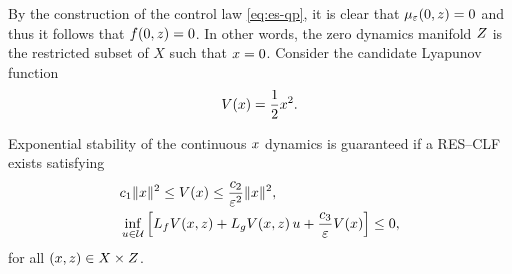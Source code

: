 \documentclass[twocolumn]{article}
\begin{document}
By the construction of the control law \eqref{eq:es-qp}, it is clear that $\mu_{\varepsilon}(0, z) = 0$ and thus it follows that $f(0, z) = 0$.
%
In other words, the zero dynamics manifold $Z$ is the restricted subset of $X$ such that $x = 0$.
%
Consider the candidate Lyapunov function
\begin{align}
  V(x) = \frac{1}{2} x^{2}.
\end{align}

\begin{proposition}  
  \label{prop:res-clf}
  Exponential stability of the continuous $x$ dynamics is guaranteed if a RES--CLF exists satisfying
  \begin{align}
    \label{eq:lyap-cond-nrg-es}
    &c_{1} \|x\|^{2} \leq V(x) \leq \frac{c_{2}}{\varepsilon^{2}} \|x\|^2,\\
    \nonumber
    &\inf_{u \in \mathcal{U}} \left[ L_{f} V(x, z) + L_{g} V(x, z) \, u + \frac{c_{3}}{\varepsilon} V(x) \right] \leq 0,
  \end{align}
  for all $(x, z) \in X \times Z$.
\end{proposition}
\end{document}
